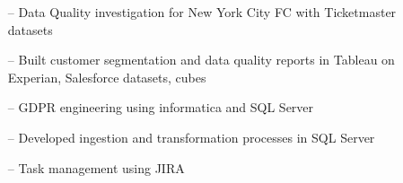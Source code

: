 \documentclass[10pt,a4paper]{altacv}
\begin{document}
\medskip




\begin{itemize}
    \setlength{\itemindent}{0.5em}
    \item[--]   \small{Data Quality investigation for New York City FC with Ticketmaster datasets}
    \item[--]   \small{Built customer segmentation and data quality reports in Tableau on Experian, Salesforce datasets, cubes}
    \item[--]   \small{GDPR engineering using informatica and SQL Server}
\end{itemize}

\medskip




\begin{itemize}
    \setlength{\itemindent}{0.5em}
    \item[--]   \small{Developed ingestion and transformation processes in SQL Server}
    \item[--]   \small{Task management using JIRA}
\end{itemize}

\medskip





\end{document}
